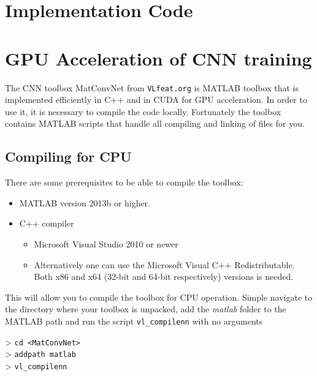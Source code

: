 \documentclass[Main]{subfiles}
\begin{document}
\section{Implementation Code} %
	\label{sec:code}




\newpage
\section{GPU Acceleration of CNN training} %
	\label{sec:gpu_acceleration_of_cnn_training}
	The CNN toolbox MatConvNet from \texttt{VLfeat.org} is MATLAB toolbox that is implemented efficiently in C++ and in CUDA for GPU acceleration.
	In order to use it, it is necessary to compile the code locally.
	Fortunately the toolbox contains MATLAB scripts that handle all compiling and linking of files for you.

	\subsection{Compiling for CPU} %
		\label{sub:compiling_for_cpu}
		There are some prerequisites to be able to compile the toolbox:
		\begin{itemize}
			\item
			MATLAB version 2013b or higher.

			\item
			C++ compiler
			\begin{itemize}
				\item
				Microsoft Visual Studio 2010 or newer

				\item
				Alternatively one can use the Microsoft Visual C++ Redistributable. Both x86 and x64 (32-bit and 64-bit respectively) versions is needed.
			\end{itemize}

		\end{itemize}

		This will allow you to compile the toolbox for CPU operation. Simple navigate to the directory where your toolbox is unpacked, add the \emph{matlab} folder to the MATLAB path and run the script \texttt{vl\_compilenn} with no arguments

		> \texttt{cd <MatConvNet>}\\
		> \texttt{addpath matlab}\\
		> \texttt{vl\_compilenn}\\
\end{document}
